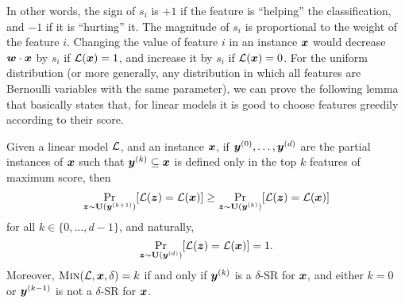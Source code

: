 In other words, the sign of $s_i$ is $+1$ if the feature is ``helping'' the classification, and $-1$ if it is ``hurting'' it. The magnitude of $s_i$ is proportional to the weight of the feature $i$. Changing the value of feature $i$ in an instance ${\bm{x}}$ would decrease ${\bm{w}} \cdot {\bm{x}}$ by $s_i$ if $\mathcal{L}({\bm{x}}) = 1$, and increase it by $s_i$ if $\mathcal{L}({\bm{x}}) = 0$.
For the uniform distribution (or more generally, any distribution in which all features are Bernoulli variables with the same parameter), we can prove the following lemma that basically states that, for linear models it is good to choose features greedily according to their score.

\begin{lemma}\label{lemma:greedy}
    Given a linear model $\mathcal{L}$, and an instance ${\bm{x}}$, if ${\bm{y}}^{(0)}, \ldots, {\bm{y}}^{(d)}$ are the partial instances of ${\bm{x}}$ such that ${\bm{y}}^{(k)} \subseteq {\bm{x}}$ is defined only in the top $k$ features of maximum score, then
    \[ 
        \Pr_{{\bm{z}} \sim \mathbf{U}({\bm{y}}^{(k+1)})}[\mathcal{L}({\bm{z}}) = \mathcal{L}({\bm{x}})] \geq \Pr_{{\bm{z}} \sim \mathbf{U}({\bm{y}}^{(k)})}[\mathcal{L}({\bm{z}}) = \mathcal{L}({\bm{x}})]
    \]
    for all $k \in \{0, \ldots, d-1\}$, and naturally, 
    \[ 
    \Pr_{{\bm{z}} \sim \mathbf{U}({\bm{y}}^{(d)})}[\mathcal{L}({\bm{z}}) = \mathcal{L}({\bm{x}})] = 1.
    \]
    Moreover, $\operatorname{\textsc{Min}}(\mathcal{L}, {\bm{x}}, \delta) = k$ if and only if ${\bm{y}}^{(k)}$ is a $\delta$-SR for ${\bm{x}}$, and either $k = 0$ or ${\bm{y}}^{(k-1)}$ is not a $\delta$-SR for ${\bm{x}}$. 
    \end{lemma}

